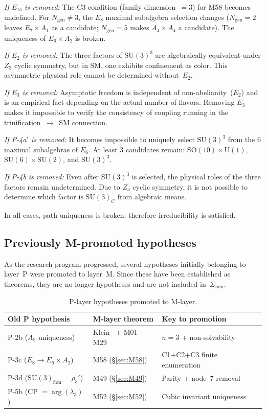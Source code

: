 \documentclass[sn-mathphys-num,Numbered]{sn-jnl}
\theoremstyle{thmstyleone}
\theoremstyle{thmstylethree}
\newcommand{\Amin}{\Sigma_{\min}}
\newcommand{\Ngen}{N_{\mathrm{gen}}}
\newcommand{\SU}{\mathrm{SU}}
\newcommand{\SO}{\mathrm{SO}}
\newcommand{\U}{\mathrm{U}}
\begin{document}
\emph{If $E_{1b}$ is removed:} The C3 condition (family dimension~$= 3$) for
M58 becomes undefined.  For $\Ngen \neq 3$, the $E_8$ maximal subalgebra
selection changes ($\Ngen = 2$ leaves $E_7 \times A_1$ as a candidate;
$\Ngen = 5$ makes $A_4 \times A_4$ a candidate).  The uniqueness of $E_6
\times A_2$ is broken.

\emph{If $E_2$ is removed:} The three factors of $\SU(3)^3$ are algebraically
equivalent under $Z_3$ cyclic symmetry, but in SM, one exhibits confinement
as color.  This asymmetric physical role cannot be determined without~$E_2$.

\emph{If $E_3$ is removed:} Asymptotic freedom is independent of
non-abelianity~($E_2$) and is an empirical fact depending on the actual number
of flavors.  Removing $E_3$ makes it impossible to verify the consistency of
coupling running in the trinification~$\to$~SM connection.

\emph{If \textup{P-4a$'$} is removed:} It becomes impossible to uniquely
select $\SU(3)^3$ from the 6 maximal subalgebras of $E_6$.  At least 3
candidates remain: $\SO(10) \times \U(1)$, $\SU(6) \times \SU(2)$, and
$\SU(3)^3$.

\emph{If \textup{P-4b} is removed:} Even after $\SU(3)^3$ is selected, the
physical roles of the three factors remain undetermined.  Due to $Z_3$ cyclic
symmetry, it is not possible to determine which factor is $\SU(3)_C$ from
algebraic means.

In all cases, path uniqueness is broken; therefore irreducibility is satisfied.


\subsection{Previously M-promoted hypotheses}\label{sec:promoted}

As the research program progressed, several hypotheses initially belonging to
layer~P were promoted to layer~M.  Since these have been established as
theorems, they are no longer hypotheses and are not included in~$\Amin$.

\begin{table}[htb]
\centering
\caption{P-layer hypotheses promoted to M-layer.}\label{tab:promoted}
\begin{tabular}{lll}
\toprule
Old P hypothesis & M-layer theorem & Key to promotion \\
\midrule
P-2b ($A_5$ uniqueness) & Klein~\cite{Klein1884} + M01--M29 &
  $n=3$ + non-solvability \\
P-3c ($E_8 \to E_6 \times A_2$) & M58 (\S\ref{sec:M58}) &
  C1+C2+C3 finite enumeration \\
P-3d ($\SU(3)_{\mathrm{fam}} = \rho_3'$) & M49 (\S\ref{sec:M49}) &
  Parity + node~7 removal \\
P-5b (CP $= \arg(\lambda_3)$) & M52 (\S\ref{sec:M52}) &
  Cubic invariant uniqueness \\
\bottomrule
\end{tabular}
\end{table}
\end{document}
